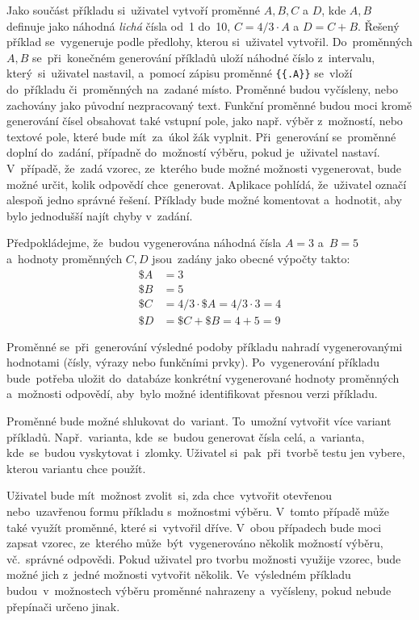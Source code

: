 \documentclass[11pt,a4paper]{report}
\begin{document}
            Jako součást příkladu si~uživatel vytvoří proměnné $A, B, C$ a $D$, kde $A, B$ definuje jako náhodná \emph{lichá} čísla od~1 do~10, $C = 4/3\cdot{A}$ a $D = C + B$. Řešený příklad se~vygeneruje podle předlohy, kterou si~uživatel vytvořil. Do~proměnných $A, B$ se~při~konečném generování příkladů uloží náhodné číslo z~intervalu, který~si~uživatel nastavil, a~pomocí zápisu proměnné \texttt{\{\{.A\}\}} se~vloží do~příkladu či~proměnných na~zadané místo. Proměnné budou vyčísleny, nebo zachovány jako původní nezpracovaný text. Funkční proměnné budou moci kromě generování čísel obsahovat také vstupní pole, jako např. výběr z~možností, nebo textové pole, které bude mít~za~úkol žák vyplnit. Při~generování se~proměnné doplní do~zadání, případně do~možností výběru, pokud je~uživatel nastaví. V~případě, že~zadá vzorec, ze~kterého bude možné možnosti vygenerovat, bude možné určit, kolik odpovědí chce~generovat. Aplikace pohlídá, že~uživatel označí alespoň jedno správné řešení. Příklady bude možné komentovat a~hodnotit, aby bylo jednodušší najít chyby v~zadání.
            
            Předpokládejme, že~budou vygenerována náhodná čísla $A = 3$ a~$B = 5$ a~hodnoty proměnných $C, D$ jsou~zadány jako obecné výpočty takto:
            \begin{align*}
                \$A &= 3 \\
                \$B &= 5 \\
                \$C &= 4/3 \cdot \$A = 4/3 \cdot 3 = 4 \\
                \$D &= \$C + \$B = 4 + 5 = 9
            \end{align*}

            Proměnné se~při~generování výsledné podoby příkladu nahradí vygenerovanými hodnotami (čísly, výrazy nebo funkčními prvky). Po~vygenerování příkladu bude~potřeba uložit do~databáze konkrétní vygenerované hodnoty proměnných a~možnosti odpovědí, aby~bylo možné identifikovat přesnou verzi příkladu.

            Proměnné bude možné shlukovat do~variant. To~umožní vytvořit více variant příkladů. Např.~varianta, kde~se~budou generovat čísla celá, a~varianta, kde~se~budou vyskytovat i~zlomky. Uživatel si~pak~při~tvorbě testu jen vybere, kterou variantu chce použít.

            Uživatel bude mít~možnost zvolit~si, zda chce~vytvořit otevřenou nebo~uzavřenou formu příkladu s~možnostmi výběru. V~tomto případě může také využít proměnné, které si~vytvořil dříve. V~obou případech bude moci zapsat vzorec, ze~kterého může~být~vygenerováno několik možností výběru, vč.~správné odpovědi. Pokud uživatel pro tvorbu možnosti využije vzorec, bude možné jich z~jedné možnosti vytvořit několik. Ve~výsledném příkladu budou~v~možnostech výběru proměnné nahrazeny a~vyčísleny, pokud nebude přepínači určeno jinak.
\end{document}
